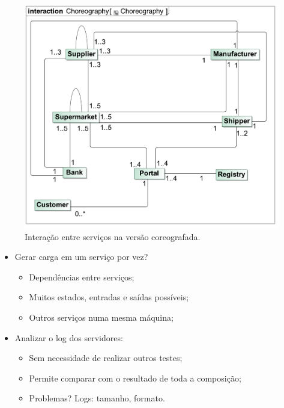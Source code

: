 \documentclass{beamer}
\begin{document}
\begin{frame}
\begin{figure}
\includegraphics[height=0.85\textheight,clip=true,trim=2mm 10mm 5mm 14mm]{figures/chor}
\caption{Interação entre serviços na versão coreografada.}
\end{figure}
\end{frame}

\begin{frame}
\begin{itemize}
  \item Gerar carga em um serviço por vez?
  \begin{itemize}
    \item Dependências entre serviços;
    \item Muitos estados, entradas e saídas possíveis;
    \item Outros serviços numa mesma máquina;
  \end{itemize}
  \item Analizar o log dos servidores:
  \begin{itemize}
    \item Sem necessidade de realizar outros testes;
    \item Permite comparar com o resultado de toda a composição;
    \item Problemas? Logs: tamanho, formato.
  \end{itemize}
\end{itemize}
\end{frame}
\end{document}
